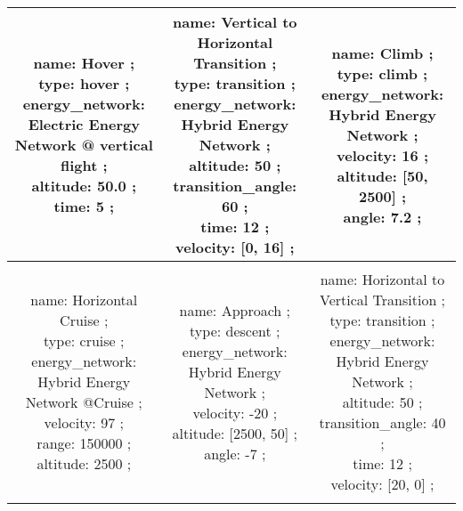 \begin{table}[h]
\begin{adjustbox}{width=1\textwidth}
\begin{tabular}{|c|c|c|}
\makecell{name: Hover ; \\ type: hover ; \\ energy\_network: Electric Energy Network @ vertical flight ; \\ altitude: 50.0 ; \\ time: 5 ; \\ } & \makecell{name: Vertical to Horizontal Transition ; \\ type: transition ; \\ energy\_network: Hybrid Energy Network ; \\ altitude: 50 ; \\ transition\_angle: 60 ; \\ time: 12 ; \\ velocity: [0, 16] ; \\ } & \makecell{name: Climb ; \\ type: climb ; \\ energy\_network: Hybrid Energy Network ; \\ velocity: 16 ; \\ altitude: [50, 2500] ; \\ angle: 7.2 ; \\ }\\ \hline \\ 
\makecell{name: Horizontal Cruise ; \\ type: cruise ; \\ energy\_network: Hybrid Energy Network @Cruise ; \\ velocity: 97 ; \\ range: 150000 ; \\ altitude: 2500 ; \\ } & \makecell{name: Approach ; \\ type: descent ; \\ energy\_network: Hybrid Energy Network ; \\ velocity: -20 ; \\ altitude: [2500, 50] ; \\ angle: -7 ; \\ } & \makecell{name: Horizontal to Vertical Transition ; \\ type: transition ; \\ energy\_network: Hybrid Energy Network ; \\ altitude: 50 ; \\ transition\_angle: 40 ; \\ time: 12 ; \\ velocity: [20, 0] ; \\ }\\ \hline \\ 

\end{tabular}
\end{adjustbox}
\end{table}
